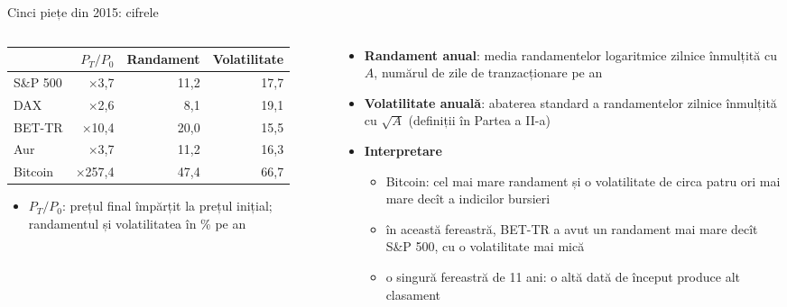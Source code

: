 \begin{frame}{Cinci piețe din 2015: cifrele}
\itemsize{\footnotesize}
\begin{columns}[T]
\begin{column}{0.52\textwidth}
\begin{center}
\footnotesize
\begin{tabular}{lrrr}
\toprule
& $P_T / P_0$ & \textbf{Randament} & \textbf{Volatilitate} \\
\midrule
S\&P 500 & $\times$3{,}7 & 11{,}2 & 17{,}7 \\
DAX & $\times$2{,}6 & 8{,}1 & 19{,}1 \\
BET-TR & $\times$10{,}4 & 20{,}0 & 15{,}5 \\
Aur & $\times$3{,}7 & 11{,}2 & 16{,}3 \\
Bitcoin & $\times$257{,}4 & 47{,}4 & 66{,}7 \\
\bottomrule
\end{tabular}
\end{center}
\begin{itemize}
    \item $P_T / P_0$: prețul final împărțit la prețul inițial; randamentul și volatilitatea în \% pe an
\end{itemize}
\end{column}
\begin{column}{0.45\textwidth}
\begin{itemize}
    \item \textbf{Randament anual}: media randamentelor logaritmice zilnice înmulțită cu $A$, numărul de zile de tranzacționare pe an
    \item \textbf{Volatilitate anuală}: abaterea standard a randamentelor zilnice înmulțită cu $\sqrt{A}$ (definiții în Partea a II-a)
    \item \textbf{Interpretare}
    \begin{itemize}
        \item Bitcoin: cel mai mare randament și o volatilitate de circa patru ori mai mare decît a indicilor bursieri
        \item în această fereastră, BET-TR a avut un randament mai mare decît S\&P 500, cu o volatilitate mai mică
        \item o singură fereastră de 11 ani: o altă dată de început produce alt clasament
    \end{itemize}
\end{itemize}
\end{column}
\end{columns}
\end{frame}

